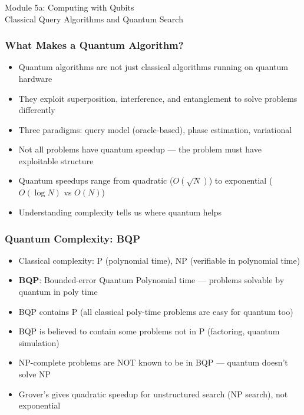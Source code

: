 
\begin{frame}[fragile]\frametitle{}
\begin{center}
{\Large Module 5a: Computing with Qubits}\\[0.5em]
{\large Classical Query Algorithms and Quantum Search}
\end{center}
\end{frame}

\begin{frame}[fragile]\frametitle{What Makes a Quantum Algorithm?}
\begin{itemize}
\item Quantum algorithms are not just classical algorithms running on quantum hardware
\item They exploit superposition, interference, and entanglement to solve problems differently
\item Three paradigms: query model (oracle-based), phase estimation, variational
\item Not all problems have quantum speedup --- the problem must have exploitable structure
\item Quantum speedups range from quadratic ($O(\sqrt{N})$) to exponential ($O(\log N)$ vs $O(N)$)
\item Understanding complexity tells us where quantum helps
\end{itemize}
\end{frame}

\begin{frame}[fragile]\frametitle{Quantum Complexity: BQP}
\begin{itemize}
\item Classical complexity: P (polynomial time), NP (verifiable in polynomial time)
\item \textbf{BQP}: Bounded-error Quantum Polynomial time --- problems solvable by quantum in poly time
\item BQP contains P (all classical poly-time problems are easy for quantum too)
\item BQP is believed to contain some problems not in P (factoring, quantum simulation)
\item NP-complete problems are NOT known to be in BQP --- quantum doesn't solve NP
\item Grover's gives quadratic speedup for unstructured search (NP search), not exponential
\end{itemize}
\end{frame}

